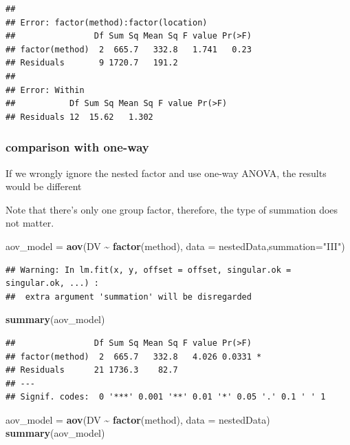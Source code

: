 \documentclass[
]{ctexart}
\newenvironment{Shaded}{\begin{snugshade}}{\end{snugshade}}
\newcommand{\AttributeTok}[1]{\textcolor[rgb]{0.13,0.29,0.53}{#1}}
\newcommand{\FunctionTok}[1]{\textcolor[rgb]{0.13,0.29,0.53}{\textbf{#1}}}
\newcommand{\NormalTok}[1]{#1}
\newcommand{\OtherTok}[1]{\textcolor[rgb]{0.56,0.35,0.01}{#1}}
\newcommand{\SpecialCharTok}[1]{\textcolor[rgb]{0.81,0.36,0.00}{\textbf{#1}}}
\newcommand{\StringTok}[1]{\textcolor[rgb]{0.31,0.60,0.02}{#1}}
\begin{document}
\begin{verbatim}
## 
## Error: factor(method):factor(location)
##                Df Sum Sq Mean Sq F value Pr(>F)
## factor(method)  2  665.7   332.8   1.741   0.23
## Residuals       9 1720.7   191.2               
## 
## Error: Within
##           Df Sum Sq Mean Sq F value Pr(>F)
## Residuals 12  15.62   1.302
\end{verbatim}

\hypertarget{comparison-with-one-way}{%
\subsubsection{comparison with one-way}\label{comparison-with-one-way}}

If we wrongly ignore the nested factor and use one-way ANOVA, the
results would be different

Note that there's only one group factor, therefore, the type of
summation does not matter.

\begin{Shaded}
\begin{Highlighting}[]
\NormalTok{aov\_model }\OtherTok{=} \FunctionTok{aov}\NormalTok{(DV }\SpecialCharTok{\textasciitilde{}} \FunctionTok{factor}\NormalTok{(method), }
                \AttributeTok{data =}\NormalTok{ nestedData,}\AttributeTok{summation=}\StringTok{"III"}\NormalTok{)}
\end{Highlighting}
\end{Shaded}

\begin{verbatim}
## Warning: In lm.fit(x, y, offset = offset, singular.ok = singular.ok, ...) :
##  extra argument 'summation' will be disregarded
\end{verbatim}

\begin{Shaded}
\begin{Highlighting}[]
\FunctionTok{summary}\NormalTok{(aov\_model)}
\end{Highlighting}
\end{Shaded}

\begin{verbatim}
##                Df Sum Sq Mean Sq F value Pr(>F)  
## factor(method)  2  665.7   332.8   4.026 0.0331 *
## Residuals      21 1736.3    82.7                 
## ---
## Signif. codes:  0 '***' 0.001 '**' 0.01 '*' 0.05 '.' 0.1 ' ' 1
\end{verbatim}

\begin{Shaded}
\begin{Highlighting}[]
\NormalTok{aov\_model }\OtherTok{=} \FunctionTok{aov}\NormalTok{(DV }\SpecialCharTok{\textasciitilde{}} \FunctionTok{factor}\NormalTok{(method), }
                \AttributeTok{data =}\NormalTok{ nestedData)}
\FunctionTok{summary}\NormalTok{(aov\_model)}
\end{Highlighting}
\end{Shaded}
\end{document}
